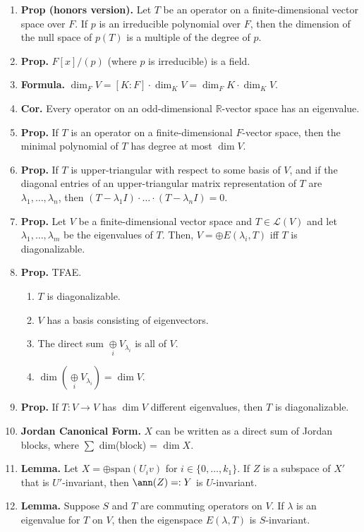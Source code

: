 \begin{enumerate}
	\item \textbf{Prop (honors version). } Let $T$ be an operator on a finite-dimensional vector space over $F$. If $p$ is an irreducible polynomial over $F$, then the dimension of the null space of $p(T)$ is a multiple of the degree of $p$. 
	\item \textbf{Prop. } $F[x] / (p)$ (where $p$ is irreducible) is a field. 
	\item \textbf{Formula. } $\dim_F V = [K:F] \cdot \dim_K V = \dim_F K \cdot \dim_K V$. 
	\item \textbf{Cor. } Every operator on an odd-dimensional $\mathbb{R}$-vector space has an eigenvalue. 
	\item \textbf{Prop. } If $T$ is an operator on a finite-dimensional $F$-vector space, then the minimal polynomial of $T$ has degree at most $\dim V$. 
	\item \textbf{Prop. } If $T$ is upper-triangular with respect to some basis of $V$, and if the diagonal entries of an upper-triangular matrix representation of $T$ are $\lambda_1,\dots,\lambda_n$, then $(T-\lambda_1I) \cdot \dots \cdot (T-\lambda_nI)=0$. 
	\item \textbf{Prop. } Let $V$ be a finite-dimensional vector space and $T \in \mathscr{L}(V)$ and let $\lambda_1,\dots,\lambda_m$ be the eigenvalues of $T$. Then, $V = \oplus E(\lambda_i, T)$ iff $T$ is diagonalizable. 
	\item \textbf{Prop. } TFAE. 
	\begin{enumerate}
		\item $T$ is diagonalizable. 
		\item $V$ has a basis consisting of eigenvectors. 
		\item The direct sum $\underset{i}{\oplus} V_{\lambda_i}$ is all of $V$. 
		\item $\dim \left(\underset{i}{\oplus} V_{\lambda_i} \right) = \dim V$. 
	\end{enumerate}
	\item \textbf{Prop. } If $T: V \to V$ has $\dim V$ different eigenvalues, then $T$ is diagonalizable. 
	\item \textbf{Jordan Canonical Form. } $X$ can be written as a direct sum of Jordan blocks, where $\sum$ dim(block) = $\dim X$. 
	\item \textbf{Lemma. } Let $X = \oplus \textrm{span}(U_iv)$ for $i \in \{0,\dots,k_1\}$. If $Z$ is a subspace of $X'$ that is $U'$-invariant, then $\ann(Z) =: Y$ is $U$-invariant. 
	\item \textbf{Lemma. } Suppose $S$ and $T$ are commuting operators on $V$. If $\lambda$ is an eigenvalue for $T$ on $V$, then the eigenspace $E(\lambda, T)$ is $S$-invariant. 

\end{enumerate}
